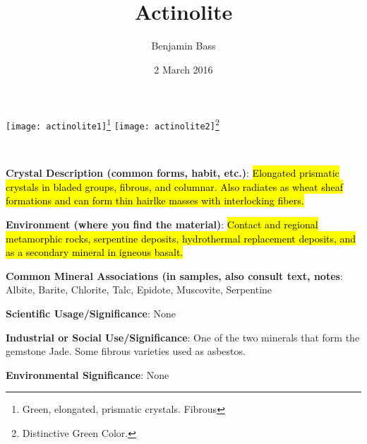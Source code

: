 \documentclass[10pt]{article}
\author{Benjamin Bass}
\date{2 March 2016}
\title{\vspace{-2.0cm}Actinolite} %
\begin{document}
\maketitle


\begin{center}
  \texttt{[image: actinolite1]}\footnote{Green, elongated, prismatic crystals. Fibrous}
  \texttt{[image: actinolite2]}\footnote{Distinctive Green Color.}
\end{center}



\
\
\
\
\
\
\
\
\
\

\begin{framed}
  \textbf{Crystal Description (common forms, habit, etc.)}: \hl{Elongated prismatic crystals in bladed groups, fibrous, and columnar. Also radiates as wheat sheaf formations and can form thin hairlke masses with interlocking fibers.}
\end{framed}

\begin{framed}
  \textbf{Environment (where you find the material)}: \hl{Contact and regional metamorphic rocks, serpentine deposits, hydrothermal replacement deposits, and as a secondary mineral in igneous basalt.}
\end{framed}

\begin{framed}
  \textbf{Common Mineral Associations (in samples, also consult text, notes}: Albite, Barite, Chlorite, Talc, Epidote, Muscovite, Serpentine
\end{framed}

\begin{framed}
  \textbf{Scientific Usage/Significance}: None
\end{framed}

\begin{framed}
  \textbf{Industrial or Social Use/Significance}: One of the two minerals that form the gemstone Jade. Some fibrous varieties used as asbestos.
\end{framed}

\begin{framed}
  \textbf{Environmental Significance}: None
\end{framed}

\end{document}
